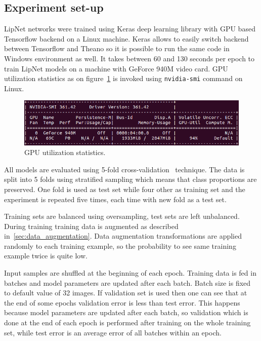 \documentclass[a4paper, 11pt, table]{article}
\begin{document}
\subsection{Experiment set-up}

LipNet networks were trained using Keras deep learning library with GPU based Tensorflow backend on a Linux machine. Keras allows to easily switch backend between Tensorflow and Theano so it is possible to run the same code in Windows environment as well. It takes between 60 and 130 seconds per epoch to train LipNet models on a machine with GeForce 940M video card. GPU utilization statistics as on figure~\ref{fig:nvidia_smi} is invoked using \texttt{nvidia-smi} command on Linux.

\begin{figure}[H]
\centering
\includegraphics[width=\textwidth]{nvidia_smi.png} 
\caption{GPU utilization statistics.}
\label{fig:nvidia_smi}
\end{figure}

All models are evaluated using 5-fold cross-validation~\cite{Kohavi:1995:SCB:1643031.1643047} technique. The data is split into 5 folds using stratified sampling which means that class proportions are preserved. One fold is used as test set while four other as training set and the experiment is repeated five times, each time with new fold as a test set.

Training sets are balanced using oversampling, test sets are left unbalanced. During training training data is augmented as described in~\ref{sec:data_augmentation}. Data augmentation transformations are applied randomly to each training example, so the probability to see same training example twice is quite low. 

Input samples are shuffled at the beginning of each epoch. Training data is fed in batches and model parameters are updated after each batch. Batch size is fixed to default value of 32 images. If validation set is used then one can see that at the end of some epochs validation error is less than test error. This happens because model parameters are updated after each batch, so validation which is done at the end of each epoch is performed after training on the whole training set, while test error is an average error of all batches within an epoch.
\end{document}
